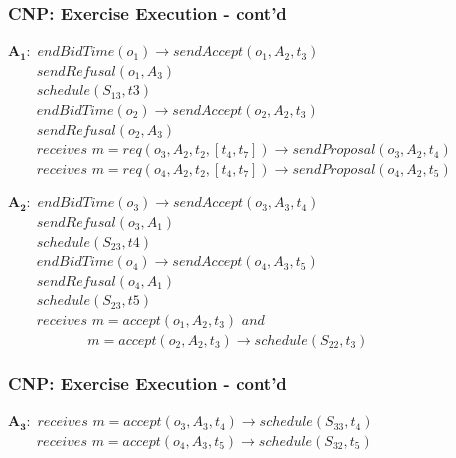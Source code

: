 \begin{frame}
	\frametitle{CNP: Exercise Execution - cont'd}
	
	\vspace{0.25cm}
	
	$ \mathbf{A_1:} $ $ endBidTime(o_1) \rightarrow sendAccept(o_1,A_2,t_3) $ \\
	$ \;\;\;\;\;\,\,\,\, sendRefusal(o_1,A_3) $ \\
	$ \;\;\;\;\;\,\,\,\, schedule(S_{13},t3) $ \\
	$ \;\;\;\;\;\,\,\,\, endBidTime(o_2) \rightarrow sendAccept(o_2,A_2,t_3) $ \\
	$ \;\;\;\;\;\,\,\,\, sendRefusal(o_2,A_3) $ \\
	$ \;\;\;\;\;\,\,\,\, receives $ $ m = req(o_3,A_2,t_2,[t_4,t_7]) \rightarrow sendProposal(o_3,A_2,t_4) $ \\
	$ \;\;\;\;\;\,\,\,\, receives $ $ m = req(o_4,A_2,t_2,[t_4,t_7]) \rightarrow sendProposal(o_4,A_2,t_5) $ \\
	
	\vspace{0.1cm}
	
	$ \mathbf{A_2:} $ $ endBidTime(o_3) \rightarrow sendAccept(o_3,A_3,t_4) $ \\
	$ \;\;\;\;\;\,\,\,\, sendRefusal(o_3,A_1) $ \\
	$ \;\;\;\;\;\,\,\,\, schedule(S_{23},t4) $ \\
	$ \;\;\;\;\;\,\,\,\, endBidTime(o_4) \rightarrow sendAccept(o_4,A_3,t_5) $ \\
	$ \;\;\;\;\;\,\,\,\, sendRefusal(o_4,A_1) $ \\
	$ \;\;\;\;\;\,\,\,\, schedule(S_{23},t5) $ \\
	$ \;\;\;\;\;\,\,\,\, receives $ $ m = accept(o_1,A_2,t_3) $ $ and $ \\
	$ \;\;\;\;\;\,\,\,\,\;\;\;\;\;\;\;\;\;\;\;\;\; m = accept(o_2,A_2,t_3) \rightarrow schedule(S_{22},t_3) $ \\
\end{frame}

\begin{frame}
	\frametitle{CNP: Exercise Execution - cont'd}
	
	\vspace{-3cm}
	
	$ \mathbf{A_3:} $ $ receives $ $ m = accept(o_3,A_3,t_4) \rightarrow schedule(S_{33},t_4) $ \\
	$ \;\;\;\;\;\,\,\,\, receives $ $ m = accept(o_4,A_3,t_5) \rightarrow schedule(S_{32},t_5) $ \\
\end{frame}

